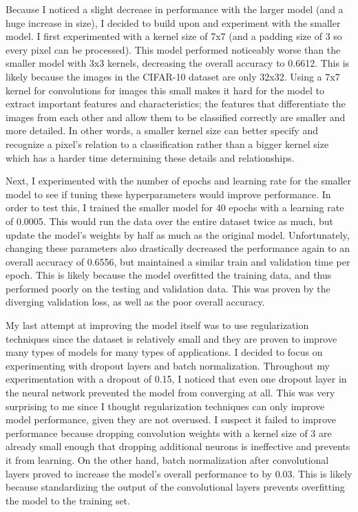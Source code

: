 \documentclass[11pt,a4paper]{article}
\begin{document}
Because I noticed a slight decrease in performance with the larger model (and a huge increase in size), I decided to build upon and experiment
 with the smaller model. I first experimented with a kernel size of 7x7 (and a padding size of 3 so every pixel can be processed).
  This model performed noticeably worse than the smaller model with 3x3 kernels, decreasing the overall accuracy to 0.6612.
   This is likely because the images in the CIFAR-10 dataset are only 32x32. Using a 7x7 kernel for convolutions for images this 
   small makes it hard for the model to extract important features and characteristics; the features that differentiate the images
    from each other and allow them to be classified correctly are smaller and more detailed. In other words, a smaller kernel size 
    can better specify and recognize a pixel's relation to a classification rather than a bigger kernel size which has a harder 
    time determining these details and relationships.

Next, I experimented with the number of epochs and learning rate for the smaller model to see if tuning these hyperparameters 
 would improve performance. In order to test this, I trained the smaller model for 40 epochs with a learning rate of 0.0005.
  This would run the data over the entire dataset twice as much, but update the model's weights by half as much as the original 
  model. Unfortunately, changing these parameters also drastically decreased the performance again to an overall accuracy of 0.6556, 
  but maintained a similar train and validation time per epoch. This is likely because the model overfitted the training data, 
  and thus performed poorly on the testing and validation data. This was proven by the diverging validation loss, as well as the 
  poor overall accuracy.

My last attempt at improving the model itself was to use regularization techniques since the dataset is relatively small and
 they are proven to improve many types of models for many types of applications. I decided to focus on experimenting with dropout 
 layers and batch normalization. Throughout my experimentation with a dropout of 0.15, I noticed that even one dropout layer in 
 the neural network prevented the model from converging \italics at all. This was very surprising to me since I thought regularization 
 techniques can only improve model performance, given they are not overused. I suspect it failed to improve performance because dropping 
 convolution weights with a kernel size of 3 are already small enough that dropping additional neurons is ineffective and prevents it
  from learning. On the other hand, batch normalization after convolutional layers proved to increase the model's overall performance
  to by 0.03. This is likely because standardizing the output of the convolutional layers prevents overfitting the model to the training set.
\end{document}

